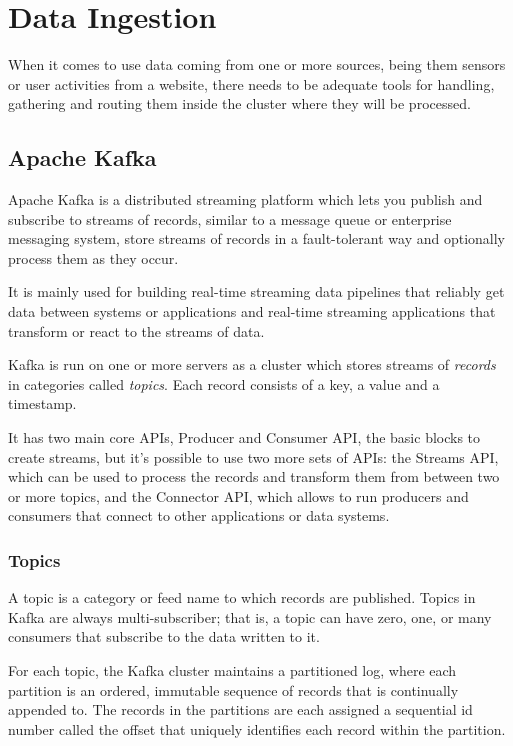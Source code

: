 \chapter{Data Ingestion}

When it comes to use data coming from one or more sources, being them sensors or user activities from a website, there needs to be adequate tools for handling, gathering and routing them inside the cluster where they will be processed.

\section{Apache Kafka}

Apache Kafka is a distributed streaming platform which lets you publish and subscribe to streams of records, similar to a message queue or enterprise messaging system, store streams of records in a fault-tolerant way and optionally process them as they occur. 

It is mainly used for building real-time streaming data pipelines that reliably get data between systems or applications and real-time streaming applications that transform or react to the streams of data.

Kafka is run on one or more servers as a cluster which stores streams of \textit{records} in categories called \textit{topics}. Each record consists of a key, a value and a timestamp.

It has two main core APIs, Producer and Consumer API, the basic blocks to create streams, but it's possible to use two more sets of APIs: the Streams API, which can be used to process the records and transform them from between two or more topics, and the Connector API, which allows to run producers and consumers that connect to other applications or data systems.

\subsection{Topics}

A topic is a category or feed name to which records are published. Topics in Kafka are always multi-subscriber; that is, a topic can have zero, one, or many consumers that subscribe to the data written to it.

For each topic, the Kafka cluster maintains a partitioned log, where each partition is an ordered, immutable sequence of records that is continually appended to. The records in the partitions are each assigned a sequential id number called the offset that uniquely identifies each record within the partition.

